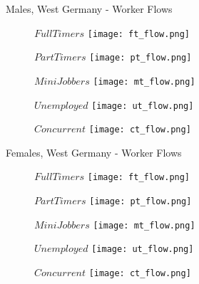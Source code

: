 \documentclass{beamer}
\begin{document}
\begin{frame}{Males, West Germany - Worker Flows}
\begin{figure}[!t]
\centering
\begin{minipage}[b]{0.3\textwidth}{$Full Timers$}
\centering
\texttt{[image: ft\_flow.png]}
\end{minipage}
\begin{minipage}[b]{0.3\textwidth}{$Part Timers$}
\centering
\texttt{[image: pt\_flow.png]}
\end{minipage}
\begin{minipage}[b]{0.3\textwidth}{$Mini Jobbers$}
\centering
\texttt{[image: mt\_flow.png]}
\end{minipage}
\end{figure}
\begin{figure}[!t]
\centering
\begin{minipage}[b]{0.3\textwidth}{$Unemployed$}
\centering
\texttt{[image: ut\_flow.png]}
\end{minipage}
\begin{minipage}[b]{0.3\textwidth}{$Concurrent$}
\centering
\texttt{[image: ct\_flow.png]}
\end{minipage}
\end{figure}
\end{frame}

\begin{frame}{Females, West Germany - Worker Flows}
\begin{figure}[!t]
\centering
\begin{minipage}[b]{0.3\textwidth}{$Full Timers$}
\centering
\texttt{[image: ft\_flow.png]}
\end{minipage}
\begin{minipage}[b]{0.3\textwidth}{$Part Timers$}
\centering
\texttt{[image: pt\_flow.png]}
\end{minipage}
\begin{minipage}[b]{0.3\textwidth}{$Mini Jobbers$}
\centering
\texttt{[image: mt\_flow.png]}
\end{minipage}
\end{figure}
\begin{figure}[!t]
\centering
\begin{minipage}[b]{0.3\textwidth}{$Unemployed$}
\centering
\texttt{[image: ut\_flow.png]}
\end{minipage}
\begin{minipage}[b]{0.3\textwidth}{$Concurrent$}
\centering
\texttt{[image: ct\_flow.png]}
\end{minipage}
\end{figure}
\end{frame}
\end{document}

